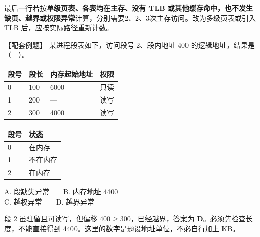 最后一行若按\textbf{单级页表、各表均在主存、没有 TLB 或其他缓存命中，也不发生缺页、越界或权限异常}计算，分别需要2、2、3次主存访问。改为多级页表或引入 TLB 后，应按实际路径重新计数。

【配套例题】 某进程段表如下，访问段号 2、段内地址 400 的逻辑地址，结果是（　）。

\begin{wideblock}

\par\medskip\noindent\begin{minipage}{\linewidth}\fontsize{9.3}{12}\selectfont\begin{tabularx}{\linewidth}{@{}YYYY@{}}
\toprule\noalign{}
段号 & 段长 & 内存起始地址 & 权限 \\
\midrule\noalign{}


0 & 100 & 6000 & 只读 \\
1 & 200 & --- & 读写 \\
2 & 300 & 4000 & 读写 \\
\bottomrule\end{tabularx}
\end{minipage}\par\medskip

\end{wideblock}

\begin{wideblock}

\par\medskip\noindent\begin{minipage}{\linewidth}\fontsize{9.3}{12}\selectfont\begin{tabularx}{\linewidth}{@{}YY@{}}
\toprule\noalign{}
段号 & 状态 \\
\midrule\noalign{}


0 & 在内存 \\
1 & 不在内存 \\
2 & 在内存 \\
\bottomrule\end{tabularx}
\end{minipage}\par\medskip

\end{wideblock}

A. 段缺失异常　　B. 内存地址 4400\\
C. 越权异常　　D. 越界异常

段 2 虽驻留且可读写，但偏移 \(400\ge300\)，已经越界，答案为 \textbf{D}。必须先检查长度，不能直接得到 4400。这里的数字是题设地址单位，不必自行加上 KB。

